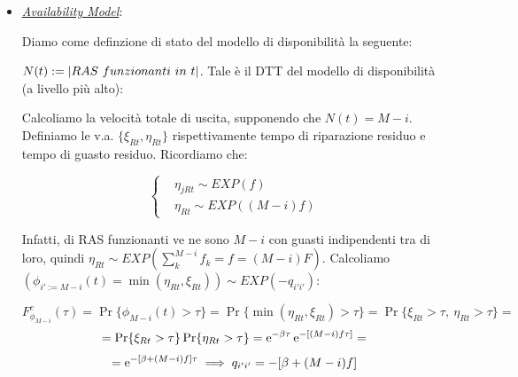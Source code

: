 \begin{itemize}

\item{\underline{\textit{Availability Model}}}:

Diamo come definzione di stato del modello di disponibilità la seguente:

$N(t):=\cardinality{RAS\ funzionanti\ in\ t}$. Tale è il DTT del modello di disponibilità (a livello più alto):

\begin{center}
\end{center}

Calcoliamo la velocità totale di uscita, supponendo che $N(t)=M-i$. Definiamo le v.a. $\{\xi_{Rt},\eta_{Rt}\}$ rispettivamente tempo di riparazione residuo e tempo di guasto residuo. Ricordiamo che:

\[
	\left\{
	\begin{aligned}
	&\eta_{jRt}\sim EXP(f)\\
	&\eta_{Rt}\sim EXP((M-i)f)
	\end{aligned}
	\right.
\]

Infatti, di RAS funzionanti ve ne sono $M-i$ con guasti indipendenti tra di loro, quindi $\eta_{Rt}\sim EXP(\sum_k^{M-i}{f_k=f} = (M-i)F)$. Calcoliamo $(\phi_{i':=M-i}(t) = \min(\eta_{Rt},\xi_{Rt}))\sim EXP(-q_{i'i'})$:

\[
	F_{\phi_{M-i}}^c(\tau) = \Pr\{\phi_{M-i}(t)>\tau\} = \Pr\{\min(\eta_{Rt},\xi_{Rt}) >\tau\} = \Pr\{\xi_{Rt}>\tau,\ \eta_{Rt}>\tau\} =
\]
\[
	= \Pr\{\xi_{Rt}>\tau\}\Pr\{\eta_{Rt}>\tau\} = \mathop{}\!\mathrm{e}^{-\beta\tau}\mathop{}\!\mathrm{e}^{-[(M-i)f\tau]} =
\]
\[
	= \mathop{}\!\mathrm{e}^{-[\beta+(M-i)f]\tau} \implies q_{i'i'} = -[\beta+(M-i)f]
\]


\end{itemize}
